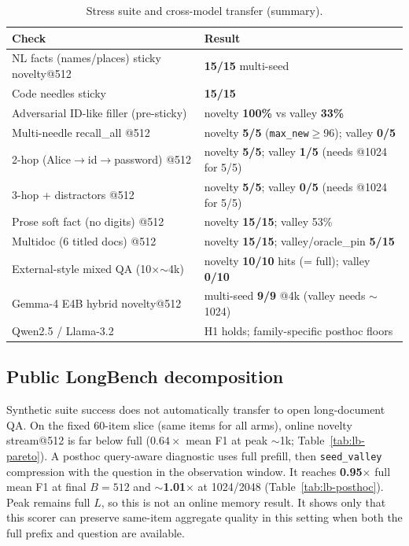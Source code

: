 \documentclass[11pt,a4paper]{article}
\begin{document}
\begin{table}[!htbp]
\centering
\caption{Stress suite and cross-model transfer (summary).}
\label{tab:transfer}
\small
\begin{tabular}{@{}lp{}@{}}
\toprule
Check & Result \\
\midrule
NL facts (names/places) sticky novelty@512 & \textbf{15/15} multi-seed \\
Code needles sticky & \textbf{15/15} \\
Adversarial ID-like filler (pre-sticky) & novelty \textbf{100\%} vs valley \textbf{33\%} \\
Multi-needle recall\_all @512 & novelty \textbf{5/5} (\texttt{max\_new}$\ge$96); valley \textbf{0/5} \\
2-hop (Alice$\to$id$\to$password) @512 & novelty \textbf{5/5}; valley \textbf{1/5} (needs @1024 for 5/5) \\
3-hop + distractors @512 & novelty \textbf{5/5}; valley \textbf{0/5} (needs @1024 for 5/5) \\
Prose soft fact (no digits) @512 & novelty \textbf{15/15}; valley 53\% \\
Multidoc (6 titled docs) @512 & novelty \textbf{15/15}; valley/oracle\_pin \textbf{5/15} \\
External-style mixed QA (10$\times$$\sim$4k) & novelty \textbf{10/10} hits (= full); valley \textbf{0/10} \\
Gemma-4 E4B hybrid novelty@512 & multi-seed \textbf{9/9} @4k (valley needs $\sim$1024) \\
Qwen2.5 / Llama-3.2 & H1 holds; family-specific posthoc floors \\
\bottomrule
\end{tabular}
\end{table}

\subsection{Public LongBench decomposition}
\label{sec:longbench}

Synthetic suite success does not automatically transfer to open long-document QA. On the fixed 60-item slice (same items for all arms), online novelty stream@512 is far below full ($0.64\times$ mean F1 at peak $\sim$1k; Table~\ref{tab:lb-pareto}). A posthoc query-aware diagnostic uses full prefill, then \texttt{seed\_valley} compression with the question in the observation window. It reaches \textbf{0.95$\times$} full mean F1 at final $B{=}512$ and $\sim$\textbf{1.01$\times$} at 1024/2048 (Table~\ref{tab:lb-posthoc}). Peak remains full $L$, so this is not an online memory result. It shows only that this scorer can preserve same-item aggregate quality in this setting when both the full prefix and question are available.
\end{document}
